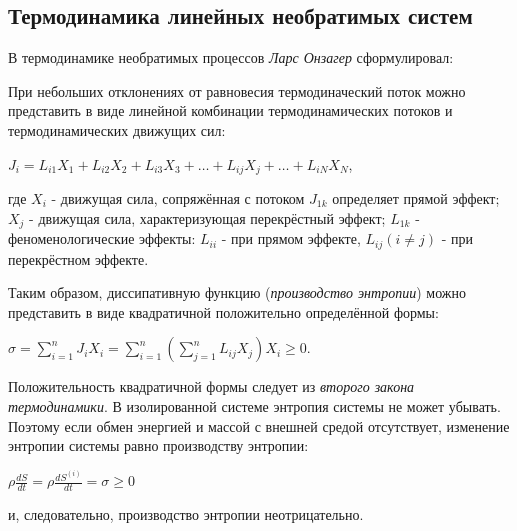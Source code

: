 \documentclass[12pt, a4paper]{report}
\begin{document}
	\subsection*{Термодинамика линейных необратимых систем}
	\large
	В термодинамике необратимых процессов \textit{Ларс Онзагер} сформулировал:
	\begin{displayquote}
		При небольших отклонениях от равновесия термодиначеский поток можно представить в виде линейной комбинации термодинамических потоков и термодинамических движущих сил:
		\begin{center}
			$J_{i} = L_{i1}X_{1} + L_{i2}X_{2} + L_{i3}X_{3} + \ldots + L_{ij}X_{j} + \ldots + L_{iN}X_{N}$,
		\end{center}
		где $X_{i}$ - движущая сила, сопряжённая с потоком $J_{1k}$ определяет прямой эффект; $X_{j}$ - движущая сила, характеризующая перекрёстный эффект; $L_{1k}$ - феноменологические эффекты: $L_{ii}$ - при прямом эффекте, $L_{ij} (i \neq j)$ - при перекрёстном эффекте.
	\end{displayquote}
	\par
	Таким образом, диссипативную функцию (\textit{производство энтропии}) можно представить в виде квадратичной положительно определённой формы:
	\begin{center}
		$\sigma = \sum_{i=1}^{n} J_{i} X_{i} = \sum_{i=1}^{n} (\sum_{j=1}^{n} L_{ij} X_{j}) X_{i} \ge 0$.
	\end{center}
	\par
	Положительность квадратичной формы следует из \textit{второго закона термодинамики}. В изолированной системе энтропия системы не может убывать. Поэтому если обмен энергией и массой с внешней средой отсутствует, изменение энтропии системы равно производству энтропии:
	\begin{center}
		$\rho \frac{dS}{dt} = \rho \frac{dS^{(i)}}{dt} = \sigma \ge 0$
	\end{center}
	и, следовательно, производство энтропии неотрицательно. \par
\end{document}
